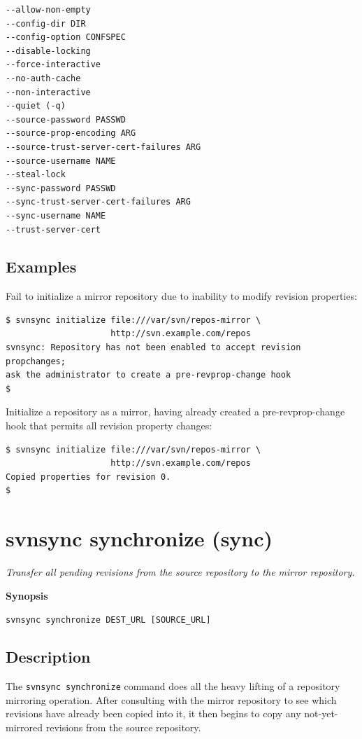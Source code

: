 \begin{verbatim}
--allow-non-empty
--config-dir DIR
--config-option CONFSPEC
--disable-locking
--force-interactive
--no-auth-cache
--non-interactive
--quiet (-q)
--source-password PASSWD
--source-prop-encoding ARG
--source-trust-server-cert-failures ARG
--source-username NAME
--steal-lock
--sync-password PASSWD
--sync-trust-server-cert-failures ARG
--sync-username NAME
--trust-server-cert
\end{verbatim}

\subsection{Examples}

Fail to initialize a mirror repository due to inability to modify
revision properties:

\begin{verbatim}
$ svnsync initialize file:///var/svn/repos-mirror \
                     http://svn.example.com/repos
svnsync: Repository has not been enabled to accept revision propchanges;
ask the administrator to create a pre-revprop-change hook
$
\end{verbatim}

Initialize a repository as a mirror, having already created a
pre-revprop-change hook that permits all revision property changes:

\begin{verbatim}
$ svnsync initialize file:///var/svn/repos-mirror \
                     http://svn.example.com/repos
Copied properties for revision 0.
$
\end{verbatim}

\section{svnsync synchronize (sync)}\label{svn.ref.svnsync.c.sync}

\emph{Transfer all pending revisions from the source repository to the
mirror repository.}

\textbf{Synopsis}

\texttt{svnsync\ synchronize\ DEST\_URL\ {[}SOURCE\_URL{]}}

\subsection{Description}

The \texttt{svnsync\ synchronize} command does all the heavy lifting of
a repository mirroring operation. After consulting with the mirror
repository to see which revisions have already been copied into it, it
then begins to copy any not-yet-mirrored revisions from the source
repository.

